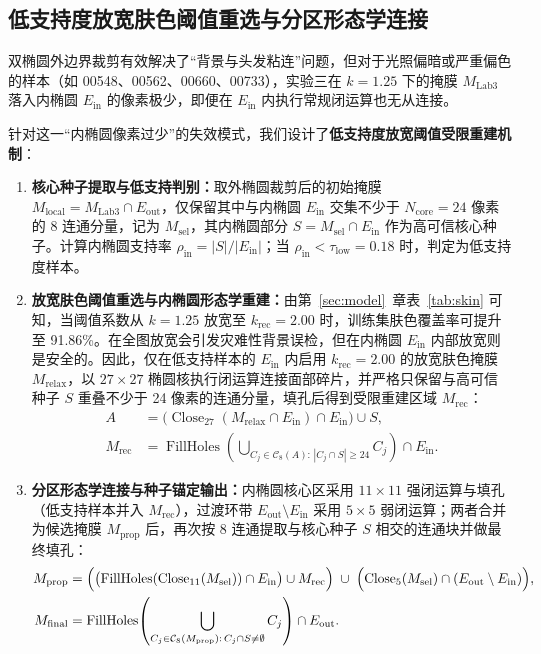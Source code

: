 \subsection{低支持度放宽肤色阈值重选与分区形态学连接}

双椭圆外边界裁剪有效解决了“背景与头发粘连”问题，但对于光照偏暗或严重偏色的样本（如 00548、00562、00660、00733），实验三在 $k=1.25$ 下的掩膜 $M_{\text{Lab3}}$ 落入内椭圆 $E_{\text{in}}$ 的像素极少，即便在 $E_{\text{in}}$ 内执行常规闭运算也无从连接。

针对这一“内椭圆像素过少”的失效模式，我们设计了\textbf{低支持度放宽阈值受限重建机制}：
\begin{enumerate}
\item \textbf{核心种子提取与低支持判别：}取外椭圆裁剪后的初始掩膜 $M_{\text{local}} = M_{\text{Lab3}} \cap E_{\text{out}}$，仅保留其中与内椭圆 $E_{\text{in}}$ 交集不少于 $N_{\text{core}}=24$ 像素的 8 连通分量，记为 $M_{\text{sel}}$，其内椭圆部分 $S = M_{\text{sel}} \cap E_{\text{in}}$ 作为高可信核心种子。计算内椭圆支持率 $\rho_{\text{in}} = |S| / |E_{\text{in}}|$；当 $\rho_{\text{in}} < \tau_{\text{low}} = 0.18$ 时，判定为低支持度样本。
\item \textbf{放宽肤色阈值重选与内椭圆形态学重建：}由第~\ref{sec:model}~章表~\ref{tab:skin} 可知，当阈值系数从 $k=1.25$ 放宽至 $k_{\text{rec}}=2.00$ 时，训练集肤色覆盖率可提升至 91.86\%。在全图放宽会引发灾难性背景误检，但在内椭圆 $E_{\text{in}}$ 内部放宽则是安全的。因此，仅在低支持样本的 $E_{\text{in}}$ 内启用 $k_{\text{rec}}=2.00$ 的放宽肤色掩膜 $M_{\text{relax}}$，以 $27\times27$ 椭圆核执行闭运算连接面部碎片，并严格只保留与高可信种子 $S$ 重叠不少于 24 像素的连通分量，填孔后得到受限重建区域 $M_{\text{rec}}$：
\begin{equation}
\begin{aligned}
A &= \bigl(\operatorname{Close}_{27}(M_{\text{relax}}\cap E_{\text{in}})\cap E_{\text{in}}\bigr)\cup S,\\
M_{\text{rec}} &= \operatorname{FillHoles}\!\left(\bigcup_{C_j\in\mathcal{C}_8(A):\,|C_j\cap S|\ge 24} C_j\right)\cap E_{\text{in}}.
\end{aligned}
\label{eq:lowsupport}
\end{equation}
\item \textbf{分区形态学连接与种子锚定输出：}内椭圆核心区采用 $11\times11$ 强闭运算与填孔（低支持样本并入 $M_{\text{rec}}$），过渡环带 $E_{\text{out}}\setminus E_{\text{in}}$ 采用 $5\times5$ 弱闭运算；两者合并为候选掩膜 $M_{\text{prop}}$ 后，再次按 8 连通提取与核心种子 $S$ 相交的连通块并做最终填孔：
\begin{equation}
\begin{aligned}
M_{\text{prop}} &= \Bigl(\bigl(\operatorname{FillHoles}(\operatorname{Close}_{11}(M_{\text{sel}}))\cap E_{\text{in}}\bigr)\cup M_{\text{rec}}\Bigr)
\;\cup\; \Bigl(\operatorname{Close}_{5}(M_{\text{sel}})\cap (E_{\text{out}}\setminus E_{\text{in}})\Bigr),\\
M_{\text{final}} &= \operatorname{FillHoles}\!\left(\bigcup_{C_j\in\mathcal{C}_8(M_{\text{prop}}):\,C_j\cap S\neq\emptyset} C_j\right)\cap E_{\text{out}}.
\end{aligned}
\label{eq:zonalmorph}
\end{equation}
\end{enumerate}

